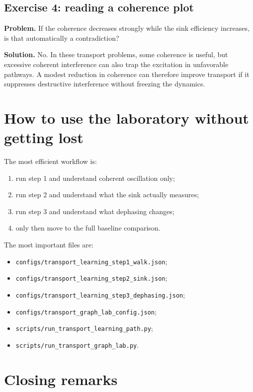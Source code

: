 \documentclass[11pt,a4paper]{article}
\begin{document}
\subsection*{Exercise 4: reading a coherence plot}

\textbf{Problem.} If the coherence decreases strongly while the sink efficiency increases, is that automatically a contradiction?

\textbf{Solution.} No. In these transport problems, some coherence is useful, but excessive coherent interference can also trap the excitation in unfavorable pathways. A modest reduction in coherence can therefore improve transport if it suppresses destructive interference without freezing the dynamics.

\section{How to use the laboratory without getting lost}

The most efficient workflow is:
\begin{enumerate}
  \item run step 1 and understand coherent oscillation only;
  \item run step 2 and understand what the sink actually measures;
  \item run step 3 and understand what dephasing changes;
  \item only then move to the full baseline comparison.
\end{enumerate}

The most important files are:
\begin{itemize}
  \item \texttt{configs/transport\_learning\_step1\_walk.json};
  \item \texttt{configs/transport\_learning\_step2\_sink.json};
  \item \texttt{configs/transport\_learning\_step3\_dephasing.json};
  \item \texttt{configs/transport\_graph\_lab\_config.json};
  \item \texttt{scripts/run\_transport\_learning\_path.py};
  \item \texttt{scripts/run\_transport\_graph\_lab.py}.
\end{itemize}

\section{Closing remarks}
\end{document}
